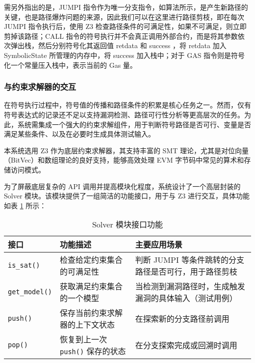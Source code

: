 \documentclass[print, master, vlined, timesmath]{DissertUESTC}
\begin{document}
需另外指出的是，JUMPI 指令作为唯一分支指令，如算法所示，是产生新路径的关键，也是路径爆炸问题的来源，因此我们可以在这里进行路径剪枝，即在每次 JUMPI 指令执行后，使用 Z3 检查路径条件的可满足性，如果不可满足，则立即剪掉该路径；CALL 指令的符号执行并不会真正调用外部合约，而是将其参数依次弹出栈，然后分别符号化其返回值 retdata 和 success ，将 retdata 加入 SymbolicState 所管理的内存中，将 success 加入栈中；对于 GAS 指令则是符号化一个常量压入栈中，表示当前的 Gas 量。

\subsubsection{与约束求解器的交互}
在符号执行过程中，符号值的传播和路径条件的积累是核心任务之一。然而，仅有符号表达式的记录还不足以支持漏洞检测、路径可行性分析等更高层次的任务。为此，系统需集成一个强大的约束求解组件，用于判断符号路径是否可行、变量是否满足某些条件、以及在必要时生成具体测试输入。

本系统选用 Z3 作为底层约束求解器，其支持丰富的 SMT 理论，尤其是对位向量（BitVec）和数组理论的良好支持，能够高效处理 EVM 字节码中常见的算术和存储访问模式。

为了屏蔽底层复杂的 API 调用并提高模块化程度，系统设计了一个高层封装的 Solver 模块。该模块提供了一组简洁的功能接口，用于与 Z3 进行交互，具体功能如表 \ref{tab:solver_interface} 所示：


\begin{table}[htbp]
    \centering
    \begin{tabularx}{\linewidth}{ll >{\RaggedRight}X}
        \toprule
        \textbf{接口} & \textbf{功能描述} & \textbf{主要应用场景} \\
        \midrule
        \texttt{is\_sat()} & 检查给定约束集合的可满足性 & 判断 JUMPI 等条件跳转的分支路径是否可行，用于路径剪枝 \\
        \addlinespace %
        \texttt{get\_model()} & 获取满足约束集合的一个模型 & 当检测到漏洞路径时，生成触发漏洞的具体输入（测试用例） \\
        \addlinespace %
        \texttt{push()} & 保存当前约束求解器的上下文状态 & 在探索新的分支路径前调用 \\
        \addlinespace %
        \texttt{pop()} & 恢复到上一次 \texttt{push()} 保存的状态 & 在分支探索完成或回溯时调用 \\
        \bottomrule
    \end{tabularx} %
    \caption{Solver 模块接口功能}
    \label{tab:solver_interface}
\end{table}
\end{document}
